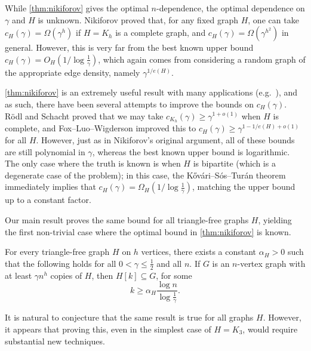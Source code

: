 While \cref{thm:nikiforov} gives the optimal $n$-dependence, the optimal dependence on $\gamma$ and $H$ is unknown. Nikiforov proved that, for any fixed graph $H$, one can take $c_{H}(\gamma) = \Omega(\gamma^{h})$ if $H=K_h$ is a complete graph, and $c_H(\gamma)=\Omega(\gamma^{h^2})$ in general. However, this is very far from the best known upper bound $c_H(\gamma) = O_H(1/{\log \frac 1 \gamma})$, which again comes from considering a random graph of the appropriate edge density, namely $\gamma^{1/e(H)}$.

\cref{thm:nikiforov} is an extremely useful result with many applications (e.g.\ \cite{MR2520282,MR2993136,MR4625871,MR4195582}), and as such, there have been several attempts to improve the bounds on $c_H(\gamma)$. R\"odl and Schacht \cite{MR2993136} proved that we may take $c_{K_h}(\gamma) \geq \gamma^{1+o(1)}$ when $H$ is complete, and Fox--Luo--Wigderson \cite{MR4195582} improved this to $c_H(\gamma) \geq \gamma^{1-1/e(H)+o(1)}$ for all $H$. However, just as in Nikiforov's original argument, all of these bounds are still polynomial in $\gamma$, whereas the best known upper bound is logarithmic. The only case where the truth is known is when $H$ is bipartite (which is a degenerate case of the problem); in this case, the K\H ov\'ari--S\'os--Tur\'an theorem \cite{MR0065617} immediately implies that $c_H(\gamma) = \Omega_H(1/{\log \frac 1\gamma})$, matching the upper bound up to a constant factor.

Our main result proves the same bound for all triangle-free graphs $H$, yielding the first non-trivial case where the optimal bound in \cref{thm:nikiforov} is known.
\begin{theorem}\label{thm:main}
    For every triangle-free graph $H$ on $h$ vertices, there exists a constant $\alpha_H>0$ such that the following holds for all $0<\gamma\leq \frac 12$ and all $n$. If $G$ is an $n$-vertex graph with at least $\gamma n^h$ copies of $H$, then $H[k] \subseteq G$, for some
    \[
        k \geq \alpha_H \frac{\log n}{\log \frac 1 \gamma}.
    \]
\end{theorem}
It is natural to conjecture that the same result is true for all graphs $H$. However, it appears that proving this, even in the simplest case of $H=K_3$, would require substantial new techniques. 


